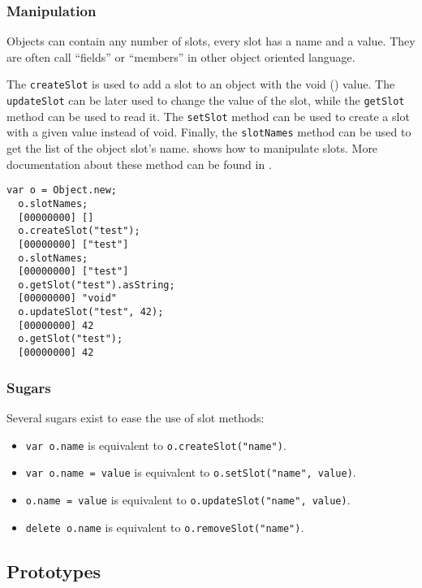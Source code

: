 \documentclass[openright,twoside,12pt]{report}
\begin{document}
\subsubsection{Manipulation}

Objects can contain any number of slots, every slot has a name and a
value. They are often call ``fields'' or ``members'' in other object
oriented language.

The \lstinline|createSlot| is used to add a slot to an object with the
void () value. The \lstinline|updateSlot| can be later
used to change the value of the slot, while the \lstinline|getSlot|
method can be used to read it. The \lstinline|setSlot| method can be
used to create a slot with a given value instead of void. Finally, the
\lstinline|slotNames| method can be used to get the list of the object
slot's name.  shows how to manipulate slots. More
documentation about these method can be found in .

\begin{lstlisting}[caption=Manipulating slots, label=lst:slots,
  float=\floatpos]
  var o = Object.new;
  o.slotNames;
  [00000000] []
  o.createSlot("test");
  [00000000] ["test"]
  o.slotNames;
  [00000000] ["test"]
  o.getSlot("test").asString;
  [00000000] "void"
  o.updateSlot("test", 42);
  [00000000] 42
  o.getSlot("test");
  [00000000] 42
\end{lstlisting}

\subsubsection{Sugars}

Several sugars exist to ease the use of slot methods:

\begin{itemize}
\item \lstinline|var o.name| is equivalent to
  \lstinline|o.createSlot("name")|.
\item \lstinline|var o.name = value| is equivalent to
  \lstinline|o.setSlot("name", value)|.
\item \lstinline|o.name = value| is equivalent to
  \lstinline|o.updateSlot("name", value)|.
\item \lstinline|delete o.name| is equivalent to
  \lstinline|o.removeSlot("name")|.
\end{itemize}


\subsection{Prototypes}
\end{document}
